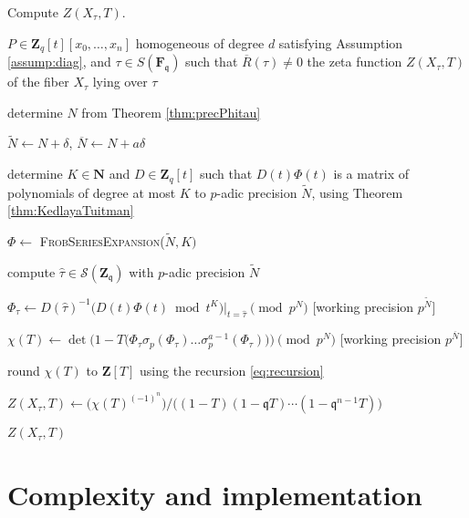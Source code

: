 \documentclass[a4paper,11pt]{article}
\numberwithin{equation}{section}
\newcommand{\NN}{\mathbf{N}} %
\newcommand{\ZZ}{\mathbf{Z}} %
\theoremstyle{definition}
\begin{document}
\begin{algorithm} 
\caption{Compute $Z(X_{\tau},T)$.}
\label{alg:complete}
\begin{algorithmic}
\vspace{1mm}
\Require $P \in \ZZ_q[t][x_0,\ldots,x_n]$ homogeneous of degree $d$ satisfying Assumption \ref{assump:diag}, and $\tau \in S(\mathbf{F}_{\mathfrak{q}})$ such that $\overline{R}(\tau) \neq 0$
\Ensure  the zeta function $Z(X_{\tau},T)$ of the fiber $X_{\tau}$ lying over $\tau$
\State \begin{compactenum}[{\hspace{1em} } 1.] \vspace{-1.24em}
\item determine $N$ from Theorem \ref{thm:precPhitau}
\item $\tilde{N} \gets N + \delta$, $\overline{N} \gets N+a \delta$
\item determine $K \in \NN$ and $D \in \ZZ_q[t]$ such that $D(t) \Phi(t)$ is a matrix of polynomials 
      of degree at most $K$ to $p$-adic precision $\tilde{N}$, using Theorem \ref{thm:KedlayaTuitman}
\item $\Phi \gets$ \textsc{FrobSeriesExpansion($\tilde{N},K)$}
\item compute $\hat{\tau} \in \mathcal{S}(\ZZ_{\mathfrak{q}})$ with $p$-adic precision $\tilde{N}$
\item $\Phi_{\tau} \gets D(\hat{\tau})^{-1} \bigl( D(t) \Phi(t) \bmod{t^{K}} \bigr)|_{t=\hat{\tau}} \pmod{p^{N}}$ [working precision $p^{\tilde{N}}$]
\item $\chi(T) \gets \det\bigl(1-T \bigl(\Phi_{\tau} \sigma_p(\Phi_{\tau}) \ldots \sigma_p^{a-1}(\Phi_{\tau}) \bigr)  \bigr) \pmod{p^{N}}$ [working precision $p^{\overline{N}}$]
\item round $\chi(T)$ to $\ZZ[T]$ using the recursion \eqref{eq:recursion} 
\item $Z(X_{\tau},T) \gets \bigl( \chi(T)^{(-1)^n} \bigr)/\bigl((1 - T) (1 - \mathfrak{q}T) \dotsm (1 - \mathfrak{q}^{n-1}T)\bigr)$
\item \Return $Z(X_{\tau},T)$
\end{compactenum}
\EndProcedure
\end{algorithmic}
\end{algorithm}


\section{Complexity and implementation}
\end{document}
